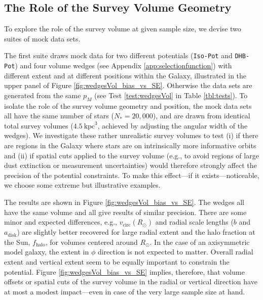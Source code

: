 \documentclass[iop,revtex4,numberedappendix,appendixfloats]{emulateapj}
\newcommand{\pmodel}{\ensuremath{p_M}}
\begin{document}

\subsection{The Role of the Survey Volume Geometry} \label{sec:results_obsvolume}

To explore the role of the survey volume at given sample size, we devise two suites of mock data sets.

The first suite draws mock data for two different potentials (\texttt{Iso-Pot} and \texttt{DHB-Pot}) and four volume wedges (see Appendix \ref{app:selectionfunction}) with different extent and at different positions within the Galaxy, illustrated in the upper panel of Figure \ref{fig:wedgesVol_bias_vs_SE}. Otherwise the data sets are generated from the same \pmodel{} (see Test \ref{test:wedgesVol} in Table \ref{tbl:tests}). To isolate the role of the survey volume geometry and position, the mock data sets all have the same number of stars ($N_{*} = 20,000$), and are drawn from identical total survey volumes ($4.5~\text{kpc}^3$, achieved by adjusting the angular width of the wedges).
We investigate these rather unrealistic survey volumes to test (i) if there are regions in the Galaxy where stars are on intrinsically more informative orbits and (ii) if spatial cuts applied to the survey volume (e.g., to avoid regions of large dust extinction or measurement uncertainties) would therefore strongly affect the precision of the potential constraints. To make this effect---if it exists---noticeable, we choose some extreme but illustrative examples.

The results are shown in Figure \ref{fig:wedgesVol_bias_vs_SE}. The wedges all have the same volume and all give results of similar precision. There are some minor and expected differences, e.g., $v_\text{circ}(R_\odot)$ and radial scale lengths ($b$ and $a_\text{disk}$) are slightly better recovered for large radial extent and the halo fraction at the Sun, $f_\text{halo}$, for volumes centered around $R_\odot$. In the case of an axisymmetric model galaxy, the extent in $\phi$ direction is not expected to matter. Overall radial extent and vertical extent seem to be equally important to constrain the potential. Figure \ref{fig:wedgesVol_bias_vs_SE} implies, therefore, that volume offsets or spatial cuts of the survey volume in the radial or vertical direction have at most a modest impact---even in case of the very large sample size at hand.
\end{document}
